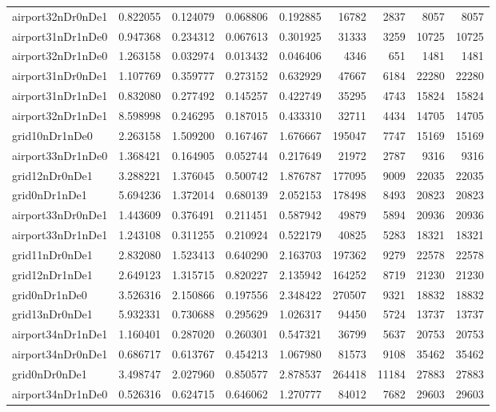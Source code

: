 \begin{longtable}{|l|r|r|r|r|r|r|r|r|}
airport32nDr0nDe1 & 0.822055 & 0.124079 & 0.068806 & 0.192885 & 16782 & 2837 & 8057 & 8057 \\
airport31nDr1nDe0 & 0.947368 & 0.234312 & 0.067613 & 0.301925 & 31333 & 3259 & 10725 & 10725 \\
airport32nDr1nDe0 & 1.263158 & 0.032974 & 0.013432 & 0.046406 & 4346 & 651 & 1481 & 1481 \\
airport31nDr0nDe1 & 1.107769 & 0.359777 & 0.273152 & 0.632929 & 47667 & 6184 & 22280 & 22280 \\
airport31nDr1nDe1 & 0.832080 & 0.277492 & 0.145257 & 0.422749 & 35295 & 4743 & 15824 & 15824 \\
airport32nDr1nDe1 & 8.598998 & 0.246295 & 0.187015 & 0.433310 & 32711 & 4434 & 14705 & 14705 \\
grid10nDr1nDe0 & 2.263158 & 1.509200 & 0.167467 & 1.676667 & 195047 & 7747 & 15169 & 15169 \\
airport33nDr1nDe0 & 1.368421 & 0.164905 & 0.052744 & 0.217649 & 21972 & 2787 & 9316 & 9316 \\
grid12nDr0nDe1 & 3.288221 & 1.376045 & 0.500742 & 1.876787 & 177095 & 9009 & 22035 & 22035 \\
grid0nDr1nDe1 & 5.694236 & 1.372014 & 0.680139 & 2.052153 & 178498 & 8493 & 20823 & 20823 \\
airport33nDr0nDe1 & 1.443609 & 0.376491 & 0.211451 & 0.587942 & 49879 & 5894 & 20936 & 20936 \\
airport33nDr1nDe1 & 1.243108 & 0.311255 & 0.210924 & 0.522179 & 40825 & 5283 & 18321 & 18321 \\
grid11nDr0nDe1 & 2.832080 & 1.523413 & 0.640290 & 2.163703 & 197362 & 9279 & 22578 & 22578 \\
grid12nDr1nDe1 & 2.649123 & 1.315715 & 0.820227 & 2.135942 & 164252 & 8719 & 21230 & 21230 \\
grid0nDr1nDe0 & 3.526316 & 2.150866 & 0.197556 & 2.348422 & 270507 & 9321 & 18832 & 18832 \\
grid13nDr0nDe1 & 5.932331 & 0.730688 & 0.295629 & 1.026317 & 94450 & 5724 & 13737 & 13737 \\
airport34nDr1nDe1 & 1.160401 & 0.287020 & 0.260301 & 0.547321 & 36799 & 5637 & 20753 & 20753 \\
airport34nDr0nDe1 & 0.686717 & 0.613767 & 0.454213 & 1.067980 & 81573 & 9108 & 35462 & 35462 \\
grid0nDr0nDe1 & 3.498747 & 2.027960 & 0.850577 & 2.878537 & 264418 & 11184 & 27883 & 27883 \\
airport34nDr1nDe0 & 0.526316 & 0.624715 & 0.646062 & 1.270777 & 84012 & 7682 & 29603 & 29603 \\

\end{longtable}
